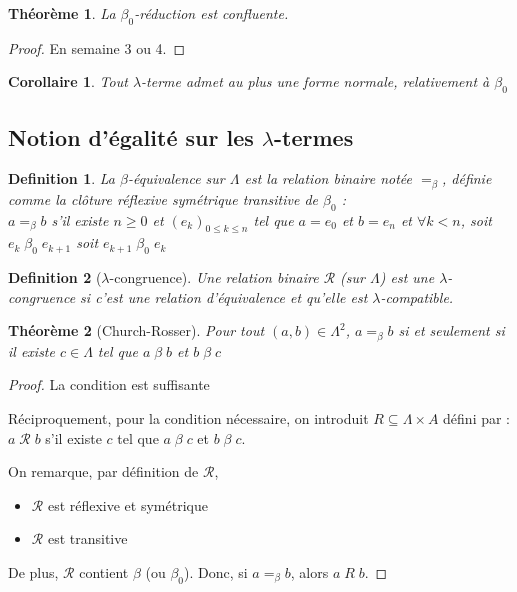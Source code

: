 \documentclass{article}
\newtheorem{thm}{Théorème}
\newtheorem{defi}{Definition}
\newtheorem{coro}{Corollaire}
\newcommand\tlambda[0]{$\lambda$}
\begin{document}
\begin{thm}
La $\beta_0$-réduction est confluente.
\end{thm}
\begin{proof}
En semaine 3 ou 4.
\end{proof}

\begin{coro}
Tout $\lambda$-terme admet au plus une forme normale, relativement à $\beta_0$
\end{coro}

\subsection*{Notion d'égalité sur les \tlambda-termes}

\begin{defi}
La $\beta$-équivalence sur $\Lambda$ est la relation binaire notée $=_\beta$, définie comme la clôture réflexive symétrique transitive de $\beta_0$ :\\
$a=_\beta b$ s'il existe $n\geq 0$ et $(e_k)_{0\leq k \leq n}$ tel que $a=e_0$ et $b=e_n$ et $\forall k<n$, soit $e_k \; \beta_0 \; e_{k+1}$ soit $e_{k+1} \; \beta_0 \; e_{k}$
\end{defi}

\begin{defi}[\tlambda-congruence]
Une relation binaire $\mathcal{R}$ (sur $\Lambda$) est une \tlambda-congruence si c'est une relation d'équivalence et qu'elle est \tlambda-compatible.
\end{defi}

\begin{thm}[Church-Rosser]
Pour tout $(a,b)\in \Lambda^2$, $a=_\beta b$ si et seulement si il existe $c\in \Lambda$ tel que $a \; \beta \; b$ et $b \; \beta \; c$
\end{thm}

\begin{proof}
La condition est suffisante
\bigskip

Réciproquement, pour la condition nécessaire, on introduit $R\subseteq \Lambda \times A$ défini par :\\
$a \; \mathcal{R} \; b$ s'il existe $c$ tel que $a\; \beta \; c$ et $b \; \beta \; c$.

On remarque, par définition de $\mathcal{R}$,
\begin{itemize}
\item $\mathcal{R}$ est réflexive et symétrique
\item $\mathcal{R}$ est transitive
\end{itemize}
De plus, $\mathcal{R}$ contient $\beta$ (ou $\beta_0$). Donc, si $a=_\beta b$, alors $a\; R \; b$.
\end{proof}
\end{document}
